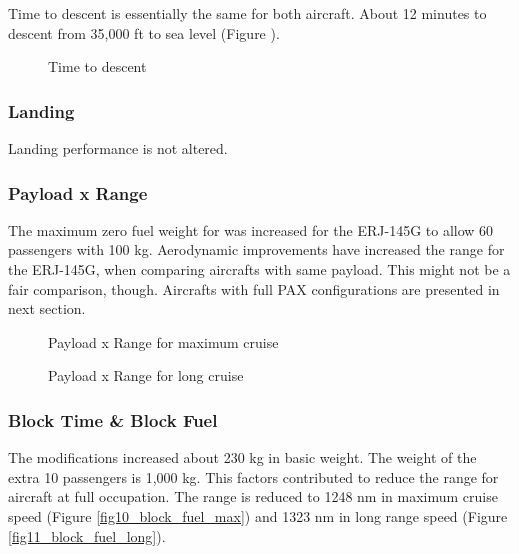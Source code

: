 Time to descent is essentially the same for both aircraft. About 12 minutes to descent from 35,000 ft to sea level (Figure ).

\begin{figure}[H] %
\caption{Time to descent}
\label{fig:fig7_time2descent}
\end{figure}

\subsubsection{Landing}

Landing performance is not altered.

\subsubsection{Payload x Range}

The maximum zero fuel weight for was increased for the ERJ-145G to allow 60 passengers with 100 kg. Aerodynamic improvements have increased the range for the ERJ-145G, when comparing aircrafts with same payload. This might not be a fair comparison, though. Aircrafts with full PAX configurations are presented in next section.

\begin{figure}[H] %
\caption{Payload x Range for maximum cruise}
\label{fig:fig8_payload_range_max}
\end{figure}

\begin{figure}[H] %
\caption{Payload x Range for long cruise}
\label{fig:fig9_payload_range_long}
\end{figure}

\subsubsection{Block Time \& Block Fuel}

The modifications increased about 230 kg in basic weight. The weight of the extra 10 passengers is 1,000 kg. This factors contributed to reduce the range for aircraft at full occupation. The range is reduced to 1248 nm in maximum cruise speed (Figure \ref{fig10_block_fuel_max}) and 1323 nm in long range speed (Figure \ref{fig11_block_fuel_long}).

